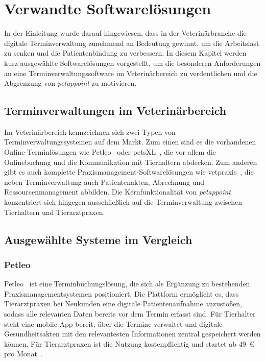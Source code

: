 \chapter{Verwandte Softwarelösungen}
In der Einleitung wurde darauf hingewiesen, dass in der Veterinärbranche 
die digitale Terminverwaltung zunehmend an Bedeutung gewinnt, um die 
Arbeitslast zu senken und die Patientenbindung zu verbessern. In diesem 
Kapitel werden kurz ausgewählte Softwarelösungen vorgestellt, um die 
besonderen Anforderungen an eine Terminverwaltungssoftware im 
Veterinärbereich zu verdeutlichen und die Abgrenzung von 
\textit{petappoint} zu motivieren.

\section{Terminverwaltungen im Veterinärbereich}
Im Veterinärbereich kennzeichnen sich zwei Typen von 
Terminverwaltungssystemen auf dem Markt. Zum einen sind es die vorhandenen Online-Terminlösungen wie Petleo~\cite{petleo-info} oder 
petsXL~\cite{petsxl-info}, die vor allem die Onlinebuchung und die 
Kommunikation mit Tierhaltern abdecken. Zum anderen gibt es auch komplette Praxismanagement-Softwarelösungen wie vetpraxis~\cite{vetpraxis-info}, die neben Terminverwaltung auch Patientenakten, Abrechnung und 
Ressourcenmanagement abbilden. Die Kernfunktionalität von 
\textit{petappoint} konzentriert sich hingegen ausschließlich auf die 
Terminverwaltung zwischen Tierhaltern und Tierarztpraxen.

\section{Ausgewählte Systeme im Vergleich}

\subsection{Petleo}
Petleo~\cite{petleo-info} ist eine Terminbuchungslösung, die sich als Ergänzung zu bestehenden Praxismanagementsystemen positioniert. Die Plattform ermöglicht es, dass Tierarztpraxen bei Neukunden eine digitale Patientenaufnahme anzustoßen, sodass alle relevanten Daten bereits vor dem Termin erfasst sind. Für Tierhalter steht eine mobile App bereit, über die Termine verwaltet und digitale Gesundheitsakten mit den relevantesten Informationen zentral gespeichert werden können. Für Tierarztpraxen ist die Nutzung kostenpflichtig und startet ab 49~€ pro Monat~\cite{petleo-info}.

